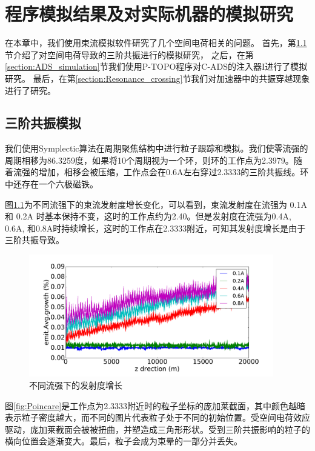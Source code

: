 \chapter{程序模拟结果及对实际机器的模拟研究} \label{chap:Simulation}
在本章中，我们使用束流模拟软件研究了几个空间电荷相关的问题。
首先，第\ref{section:3rd_order_simulation}节介绍了对空间电荷导致的三阶共振进行的模拟研究，
之后，在第\ref{section:ADS_simulation}节我们使用P-TOPO程序对C-ADS的注入器I进行了模拟研究。
最后，在第\ref{section:Resonance_crossing}节我们对加速器中的共振穿越现象进行了研究。

\section{三阶共振模拟}            \label{section:3rd_order_simulation}
我们使用Symplectic算法在周期聚焦结构中进行粒子跟踪和模拟。我们使零流强的周期相移为86.3259度，如果将10个周期视为一个环，则环的工作点为2.3979。随着流强的增加，相移会被压缩，工作点会在0.6A左右穿过2.3333的三阶共振线。环中还存在一个六极磁铁。

图\ref{fig:emitGrowthCompare}为不同流强下的束流发射度增长变化，可以看到，束流发射度在流强为 0.1A 和 0.2A 时基本保持不变，这时的工作点约为2.40。但是发射度在流强为0.4A, 0.6A, 和0.8A时持续增长，这时的工作点在2.3333附近，可知其发射度增长是由于三阶共振导致。

\begin{figure}[!htb]
    \centering
    \includegraphics[width=0.95\textwidth]{Img/SymplecticEmitGrowthCompare.pdf}
    \caption{不同流强下的发射度增长}
    \label{fig:emitGrowthCompare}
\end{figure}

图\ref{fig:Poincare}是工作点为2.3333附近时的粒子坐标的庞加莱截面，其中颜色越暗表示粒子密度越大，而不同的图片代表粒子处于不同的初始位置。受空间电荷效应驱动，庞加莱截面会被被扭曲，并塑造成三角形形状。受到三阶共振影响的粒子的横向位置会逐渐变大。最后，粒子会成为束晕的一部分并丢失。

